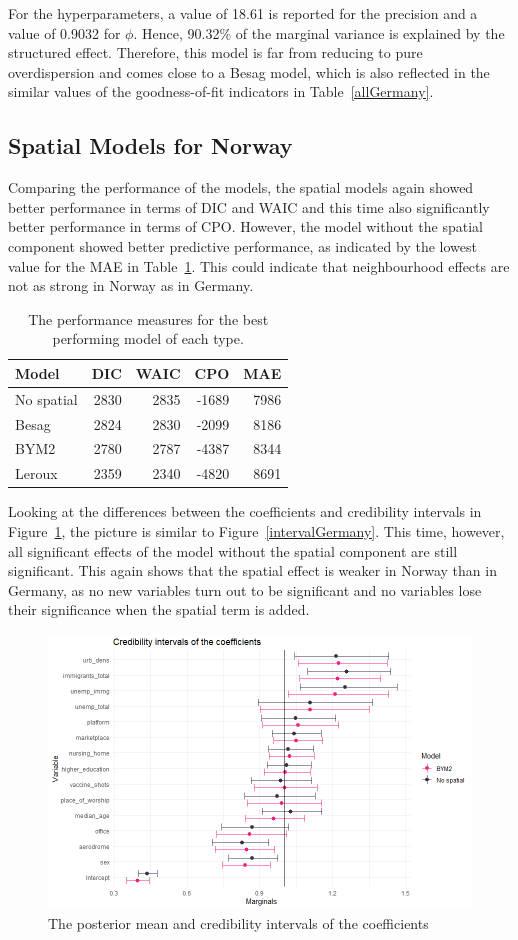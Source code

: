 For the hyperparameters, a value of 18.61 is reported for the precision and a value of 0.9032 for $\phi$. Hence, 90.32\% of the marginal variance is explained by the structured effect. Therefore, this model is far from reducing to pure overdispersion and comes close to a Besag model, which is also reflected in the similar values of the goodness-of-fit indicators in Table~\ref{allGermany}.
\subsection{Spatial Models for Norway}
Comparing the performance of the models, the spatial models again showed better performance in terms of DIC and WAIC and this time also significantly better performance in terms of CPO. However, the model without the spatial component showed better predictive performance, as indicated by the lowest value for the MAE in Table~\ref{allNorway}. This could indicate that neighbourhood effects are not as strong in Norway as in Germany.
\begin{table}[H] 
\caption{The performance measures for the best performing model of each type. \label{allNorway}}
\begin{tabular}{l r r r r}
\toprule
\textbf{Model}	& \textbf{DIC}	& \textbf{WAIC} & \textbf{CPO} & \textbf{MAE} \\
\midrule
No spatial & 2830 & 2835 & -1689 & 7986 \\
Besag & 2824 & 2830 & -2099 & 8186 \\
BYM2 & 2780 & 2787 & -4387 & 8344\\
Leroux & 2359 & 2340 & -4820 & 8691\\
\bottomrule
\end{tabular}
\end{table}
Looking at the differences between the coefficients and credibility intervals in Figure~\ref{intervalNorway}, the picture is similar to Figure~\ref{intervalGermany}. This time, however, all significant effects of the model without the spatial component are still significant. This again shows that the spatial effect is weaker in Norway than in Germany, as no new variables turn out to be significant and no variables lose their significance when the spatial term is added.
\begin{figure}[H]
  \centering
  \includegraphics[width = \textwidth]{intervals_norway.png}
  \caption{The posterior mean and credibility intervals of the coefficients}
  \label{intervalNorway}
\end{figure}
